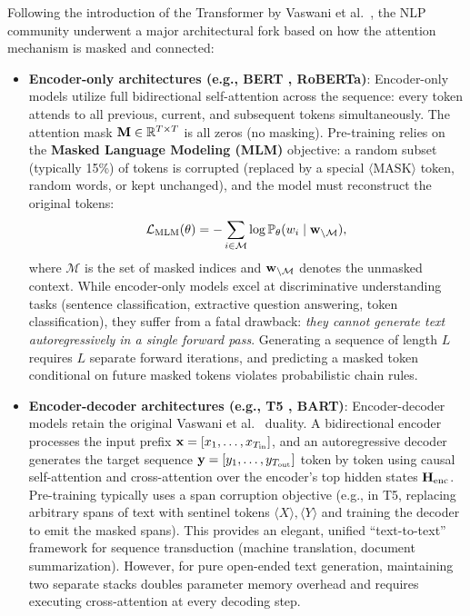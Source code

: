 \documentclass[../../main.tex]{subfiles}
\begin{document}
Following the introduction of the Transformer by Vaswani et al.~\cite{vaswani2017}, the NLP community underwent a major architectural fork based on how the attention mechanism is masked and connected:
\begin{itemize}
    \item \textbf{Encoder-only architectures (e.g., BERT \cite{devlin2019}, RoBERTa)}:
    Encoder-only models utilize full bidirectional self-attention across the sequence: every token attends to all previous, current, and subsequent tokens simultaneously. The attention mask $\mathbf{M} \in \mathbb{R}^{T \times T}$ is all zeros (no masking). 
    Pre-training relies on the \textbf{Masked Language Modeling (MLM)} objective: a random subset (typically 15\%) of tokens is corrupted (replaced by a special $\langle\text{MASK}\rangle$ token, random words, or kept unchanged), and the model must reconstruct the original tokens:
    \begin{equation}
    \label{eq:mlm_loss}
    \mathcal{L}_{\text{MLM}}(\theta) = -\sum_{i \in \mathcal{M}} \log \mathbb{P}_\theta(w_i \mid \mathbf{w}_{\setminus \mathcal{M}}),
    \end{equation}
    where $\mathcal{M}$ is the set of masked indices and $\mathbf{w}_{\setminus \mathcal{M}}$ denotes the unmasked context. While encoder-only models excel at discriminative understanding tasks (sentence classification, extractive question answering, token classification), they suffer from a fatal drawback: \emph{they cannot generate text autoregressively in a single forward pass}. Generating a sequence of length $L$ requires $L$ separate forward iterations, and predicting a masked token conditional on future masked tokens violates probabilistic chain rules.
    
    \item \textbf{Encoder-decoder architectures (e.g., T5 \cite{raffel2020t5}, BART)}:
    Encoder-decoder models retain the original Vaswani et al.~\cite{vaswani2017} duality. A bidirectional encoder processes the input prefix $\mathbf{x} = [x_1, \dots, x_{T_{\text{in}}}]$, and an autoregressive decoder generates the target sequence $\mathbf{y} = [y_1, \dots, y_{T_{\text{out}}}]$ token by token using causal self-attention and cross-attention over the encoder's top hidden states $\mathbf{H}_{\text{enc}}$.
    Pre-training typically uses a span corruption objective (e.g., in T5, replacing arbitrary spans of text with sentinel tokens $\langle X \rangle, \langle Y \rangle$ and training the decoder to emit the masked spans). This provides an elegant, unified ``text-to-text'' framework for sequence transduction (machine translation, document summarization). However, for pure open-ended text generation, maintaining two separate stacks doubles parameter memory overhead and requires executing cross-attention at every decoding step.
    

\end{itemize}
\end{document}

